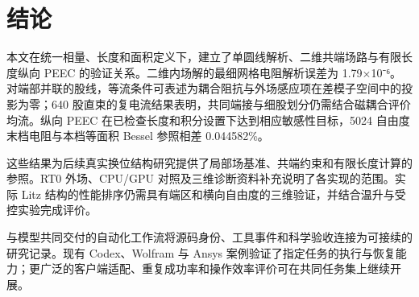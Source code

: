 \section{结论}
\label{chapter:12}

\hypertarget{12.conclusions.p1}{}
本文在统一相量、长度和面积定义下，建立了单圆线解析、二维共端场路与有限长度纵向 PEEC 的验证关系。二维内场解的最细网格电阻解析误差为 1.79×10⁻⁶。对端部并联的股线，等流条件可表述为耦合阻抗与外场感应项在差模子空间中的投影为零；640 股直束的复电流结果表明，共同端接与细股划分仍需结合磁耦合评价均流。纵向 PEEC 在已检查长度和积分设置下达到相应敏感性目标，5024 自由度末档电阻与本档等面积 Bessel 参照相差 0.044582\%。

\hypertarget{12.conclusions.p2}{}
这些结果为后续真实换位结构研究提供了局部场基准、共端约束和有限长度计算的参照。RT0 外场、CPU/GPU 对照及三维诊断资料补充说明了各实现的范围。实际 Litz 结构的性能排序仍需具有端区和横向自由度的三维验证，并结合温升与受控实验完成评价。

\hypertarget{12.automation.conclusion}{}
与模型共同交付的自动化工作流将源码身份、工具事件和科学验收连接为可接续的研究记录。现有 Codex、Wolfram 与 Ansys 案例验证了指定任务的执行与恢复能力；更广泛的客户端适配、重复成功率和操作效率评价可在共同任务集上继续开展。
